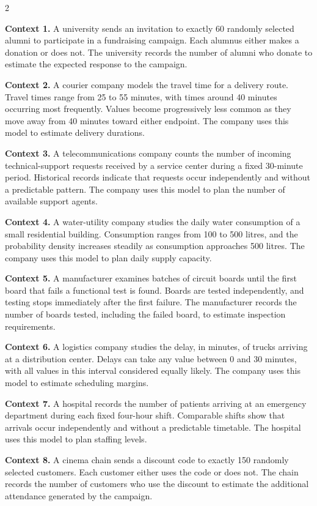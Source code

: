 \begin{multicols}{2}
{			\textbf{Context 1.} A university sends an invitation to exactly
			60 randomly selected alumni to participate in a fundraising campaign.
			Each alumnus either makes a donation or does not. The university records
			the number of alumni who donate to estimate the expected response to
			the campaign.
			
			\textbf{Context 2.} A courier company models the travel time for a
			delivery route. Travel times range from 25 to 55 minutes, with times
			around 40 minutes occurring most frequently. Values become progressively
			less common as they move away from 40 minutes toward either endpoint.
			The company uses this model to estimate delivery durations.
			
			\textbf{Context 3.} A telecommunications company counts the number of
			incoming technical-support requests received by a service center during
			a fixed 30-minute period. Historical records indicate that requests
			occur independently and without a predictable pattern. The company uses
			this model to plan the number of available support agents.
			
			\textbf{Context 4.} A water-utility company studies the daily water
			consumption of a small residential building. Consumption ranges from
			100 to 500 litres, and the probability density increases steadily as
			consumption approaches 500 litres. The company uses this model to plan
			daily supply capacity.
			
			\textbf{Context 5.} A manufacturer examines batches of circuit boards
			until the first board that fails a functional test is found. Boards are
			tested independently, and testing stops immediately after the first
			failure. The manufacturer records the number of boards tested, including
			the failed board, to estimate inspection requirements.
			
			\textbf{Context 6.} A logistics company studies the delay, in minutes,
			of trucks arriving at a distribution center. Delays can take any value
			between 0 and 30 minutes, with all values in this interval considered
			equally likely. The company uses this model to estimate scheduling
			margins.
			
			\textbf{Context 7.} A hospital records the number of patients arriving
			at an emergency department during each fixed four-hour shift.
			Comparable shifts show that arrivals occur independently and without
			a predictable timetable. The hospital uses this model to plan staffing
			levels.
			
			\textbf{Context 8.} A cinema chain sends a discount code to exactly
			150 randomly selected customers. Each customer either uses the code
			or does not. The chain records the number of customers who use the
			discount to estimate the additional attendance generated by the campaign.
			
}
\end{multicols}
